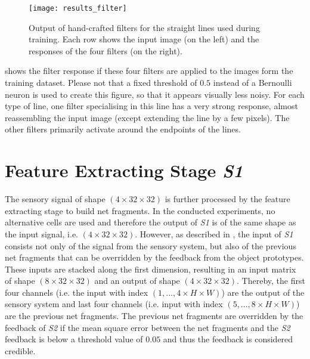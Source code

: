 \begin{figure}[h]
    \centering
    \texttt{[image: results\_filter]}
    \caption[Output of hand-crafted filters for straight lines]{Output of hand-crafted filters for the straight lines used during training. Each row shows the input image (on the left) and the responses of the four filters (on the right).}
\end{figure}

 shows the filter response if these four filters are applied to the images form the training dataset.
Please not that a fixed threshold of $0.5$ instead of a Bernoulli neuron is used to create this figure, so that it appears visually less noisy.
For each type of line, one filter specialising in this line has a very strong response, almost reassembling the input image (except extending the line by a few pixels).
The other filters primarily activate around the endpoints of the lines.


\section{Feature Extracting Stage \emph{S1}}
The sensory signal of shape $(4 \times 32 \times 32)$ is further processed by the feature extracting stage to build net fragments. In the conducted experiments, no alternative cells are used and therefore the output of \emph{S1} is of the same shape as the input signal, i.e. $(4 \times 32 \times 32)$.
However, as described in , the input of \emph{S1} consists not only of the signal from the sensory system, but also of the previous net fragments that can be overridden by the feedback from the object prototypes.
These inputs are stacked along the first dimension, resulting in an input matrix of shape $(8 \times 32 \times 32)$ and an output of shape $(4 \times 32 \times 32)$.
Thereby, the first four channels (i.e. the input with index $(1, ..., 4 \times H \times W)$) are the output of the sensory system and last four channels (i.e. input with index $(5, ..., 8 \times H \times W)$) are the previous net fragments.
The previous net fragments are overridden by the feedback of \emph{S2} if the mean square error between the net fragments and the \emph{S2} feedback is below a threshold value of $0.05$ and thus the feedback is considered credible.










